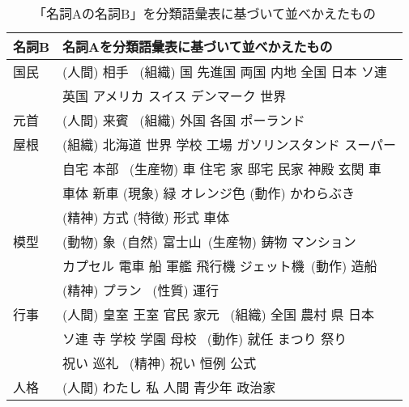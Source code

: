 \vspace*{-1mm}
\begin{table}[t]
    \caption{「名詞Aの名詞B」を分類語彙表に基づいて並べかえたもの}
    \label{tab:noun_bgh}
    \vspace{-1mm}
  \begin{center}
\begin{tabular}{|l|l|}\hline
名詞B   & 名詞Aを分類語彙表に基づいて並べかえたもの\\\hline
国民    & (人間) 相手 \, (組織) 国 先進国 両国 内地 全国 日本 ソ連\\
        & 英国 アメリカ スイス デンマーク 世界 \\\hline
元首    & (人間) 来賓 \, (組織) 外国 各国 ポーランド \\\hline
屋根    & (組織) 北海道 世界 学校 工場 ガソリンスタンド スーパー\\
        & 自宅 本部 \, (生産物) 車 住宅 家 邸宅 民家 神殿 玄関 車\\
        & 車体 新車 (現象) 緑 オレンジ色 (動作) かわらぶき\\
        & (精神) 方式 (特徴) 形式 車体\\\hline
模型    & (動物) 象 \,(自然) 富士山 \,(生産物) 鋳物 マンション\\
        &  カプセル 電車 船 軍艦 飛行機 ジェット機 \,(動作) 造船\\
        & (精神) プラン \, (性質) 運行\\\hline
行事    & (人間) 皇室 王室 官民 家元 \, (組織) 全国 農村 県 日本\\
        & ソ連 寺 学校 学園 母校 \, (動作) 就任 まつり 祭り\\
        & 祝い 巡礼 \, (精神) 祝い 恒例 公式 \\\hline
人格    & (人間) わたし 私 人間 青少年 政治家 \\\hline
\end{tabular}
\vspace*{-3mm}
\end{center}
\end{table}

